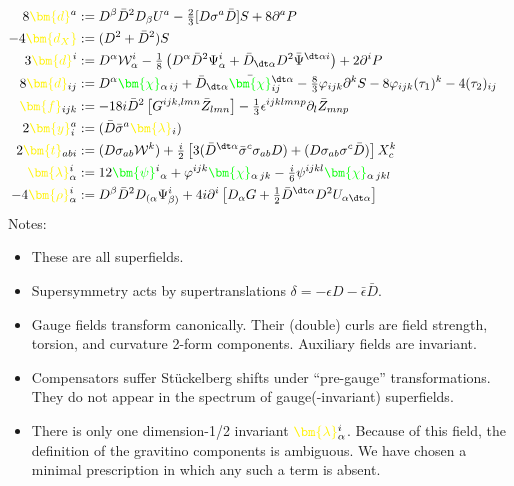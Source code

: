 \documentclass[letter,12pt]{article} %
\def\physical#1{ {\color{green} {\bm {#1}} } }
\def\auxiliary#1{ {\color{yellow} {\bm {#1}} } }
\def\grinoYX{ \physical{\psi} }
\def\spinorYY{ \physical{\chi} }
\def\spinorYYY{ \physical{\chi} }
\def\d{ \auxiliary{d_X} }
\def\dX{ \auxiliary{d} }
\def\dY{ \auxiliary{d} }
\def\dYY{ \auxiliary{d} }
\def\f{\auxiliary{f} }
\def\l{ \auxiliary{\lambda} }
\def\y{ \auxiliary{y} }
\def\t{ \auxiliary{t} }
\def\r{ \auxiliary{\rho} }
\def\X{X}
\def\T{T}
\begin{document}
{%
\begin{align}
8 \dX^a &:= D^\beta \bar D^2 D_\beta U^a
	- \tfrac 2{3} 
	[D\sigma^a \bar D]S
	+ 8 \partial^{a} P
\cr
-4 \d&:=  (D^2 + \bar D^2) S
\cr
3\dY^i&:=D^\alpha \mathcal W_\alpha^i 
		-\tfrac18\left(
			D^\alpha \bar D^2 \Psi_\alpha^i 
			+\bar D_{\dt \alpha} D^2 \bar \Psi^{\dt \alpha i}
		\right)
		+2\partial^i P
\cr
8\dYY_{ij}&:=
		D^\alpha \spinorYY_{\alpha \, ij}
		+\bar D_{\dt \alpha} \bar \spinorYY_{ij}^{\dt \alpha }
	-\tfrac83 \varphi_{ijk} \partial^k S
		-8 \varphi_{ijk} (\tau_1)^k 
		-4 (\tau_2)_{ij}
\cr
\f_{ijk}&:=-18 i \bar D^2 \left[ G^{ijk, lmn} \bar Z_{lmn}\right]
	- \tfrac 13 \epsilon^{ijk lmnp}\partial_l \bar Z_{mnp}
\cr
2\y_i^a&:=  (\bar D \bar \sigma^a \l_i)
\cr
2 \t_{ab i} &:=(D \sigma_{ab} \mathcal W_{}^k)
	+\tfrac i2 \left[  3 (\bar D^{\dt \alpha} \bar \sigma^c\sigma_{ab}  D)
	+ (D \sigma_{ab} \sigma^c \bar D)
	\right] \X_{c}^k 
\cr
\l^i_\alpha 
	&:= 12 \grinoYX^i{}_\alpha 
	+ \varphi^{ijk} \spinorYY_{\alpha\, jk}
	-\tfrac i6 \psi^{i jkl} \spinorYYY_{\alpha\, jkl}
\cr
-4 \r^i_\alpha&:= D^\beta  \bar D^2 D_{(\alpha} \Psi_{\beta)}^i 
	+4i \partial^i \left[
	D_\alpha G +\tfrac12 \bar D^{\dt \alpha} D^2 U_{\alpha \dt \alpha}
	\right]
\nonumber
\end{align}
Notes:
\begin{itemize} 
\item These are all superfields. 
\item Supersymmetry acts by supertranslations $\delta = -\epsilon D - \bar \epsilon \bar D$.
\item {\color{PineGreen} Gauge fields} transform canonically. Their (double) curls are field strength, torsion, and curvature 2-form components. {\color{Orange} Auxiliary fields} are invariant. 
\item {\color{Red} Compensators} suffer St\"uckelberg shifts under ``pre-gauge'' transformations. They do not appear in the spectrum of gauge(-invariant) superfields.
\item There is only one dimension-1/2 invariant $\l^i_\alpha$. Because of this field, the definition of the gravitino components is ambiguous. We have chosen a minimal prescription in which any such a term is absent.
\end{itemize}

} %
\end{document}
